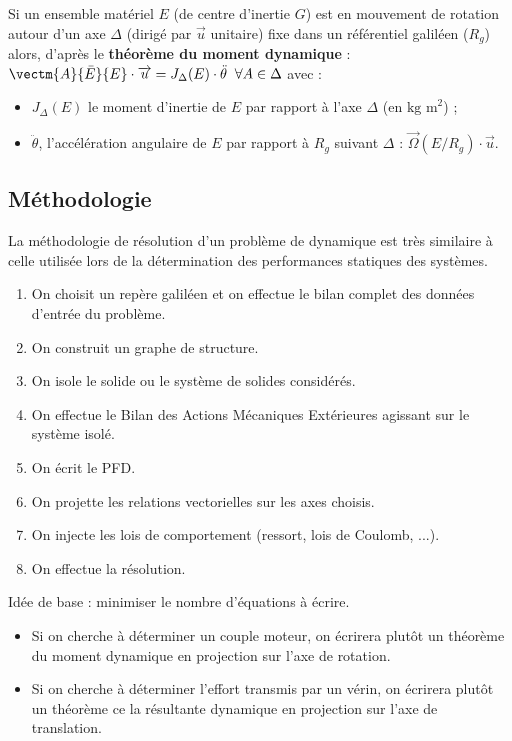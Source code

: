 \begin{defi}
Si un ensemble matériel $E$ (de centre d'inertie $G$) est en mouvement de rotation autour d'un axe $\Delta$ (dirigé par $\overrightarrow{u}$ unitaire) fixe dans un référentiel galiléen ($R_g$) alors, d'après le \textbf{théorème du moment dynamique} :
$
\vectm{A}{\bar E}{E}\cdot \overrightarrow{u}=J_{\Delta}(E)\cdot \ddot{\theta}\;\;\forall A\in \Delta
$ avec :
\begin{itemize}
\item  $J_{\Delta}(E)$ le moment d'inertie de $E$ par rapport à l'axe $\Delta$ (en $\text{kg  m}^2$) ;
\item $\ddot{\theta}$, l'accélération angulaire de $E$ par rapport à $R_g$ suivant $\Delta$ : $\overrightarrow{\Omega}(E/R_g)\cdot \overrightarrow{u}$.
\end{itemize}
\end{defi}

\subsection{Méthodologie}

\begin{methode}
La méthodologie de résolution d'un problème de dynamique est très similaire à celle utilisée lors de la détermination des performances statiques des systèmes.

\begin{enumerate}
\item On choisit un repère galiléen et on effectue le bilan complet des données d'entrée du problème.
\item On construit un graphe de structure.
\item On isole le solide ou le système de solides considérés.
\item On effectue le Bilan des Actions Mécaniques Extérieures agissant sur le système isolé.
\item On écrit le PFD.
\item On projette les relations vectorielles sur les axes choisis.
\item On injecte les lois de comportement (ressort, lois de Coulomb, ...).
\item On effectue la résolution.
\end{enumerate}
\end{methode}

\begin{methode}

Idée de base : minimiser le nombre d'équations à écrire. 
\begin{itemize}
\item Si on cherche à déterminer un couple moteur, on écrirera plutôt un théorème du moment dynamique en projection sur l'axe de rotation.
\item Si on cherche à déterminer l'effort transmis par un vérin, on écrirera plutôt un théorème ce la résultante dynamique en projection sur l'axe de translation.
\end{itemize}

\end{methode}

